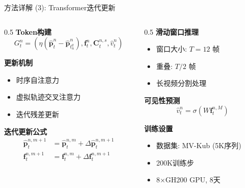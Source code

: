 \documentclass{ctexbeamer}
\begin{document}
\begin{frame}{方法详解 (3): Transformer迭代更新}
  \begin{columns}[T]
    \begin{column}{0.5\textwidth}
      \textbf{Token构建}
      \begin{equation*}
        G_t^n = (\eta(\hat{\mathbf{p}}_t^n - \hat{\mathbf{p}}_{t_n^q}^n), \mathbf{f}_t^n, \mathbf{C}_t^{n,s}, \hat{v}_t^n)
      \end{equation*}
      
      \textbf{更新机制}
      \begin{itemize}
        \item 时序自注意力
        \item 虚拟轨迹交叉注意力
        \item 迭代残差更新
      \end{itemize}
      
      \textbf{迭代更新公式}
      \begin{align*}
        \hat{\mathbf{p}}_t^{n,m+1} &= \hat{\mathbf{p}}_t^{n,m} + \Delta\hat{\mathbf{p}}_t^{n,m+1} \\
        \mathbf{f}_t^{n,m+1} &= \mathbf{f}_t^{n,m} + \Delta\mathbf{f}_t^{n,m+1}
      \end{align*}
    \end{column}
    \begin{column}{0.5\textwidth}
      \textbf{滑动窗口推理}
      \begin{itemize}
        \item 窗口大小: $T=12$ 帧
        \item 重叠: $T/2$ 帧
        \item 长视频分割处理
      \end{itemize}
      
      \vspace{0.3cm}
      \textbf{可见性预测}
      \begin{equation*}
        \hat{v}_t^n = \sigma(W \mathbf{f}_t^{n,M})
      \end{equation*}
      
      \vspace{0.2cm}
      \textbf{训练设置}
      \begin{itemize}
        \item 数据集: MV-Kub (5K序列)
        \item 200K训练步
        \item 8×GH200 GPU, 8天
      \end{itemize}
    \end{column}
  \end{columns}
\end{frame}
\end{document}

